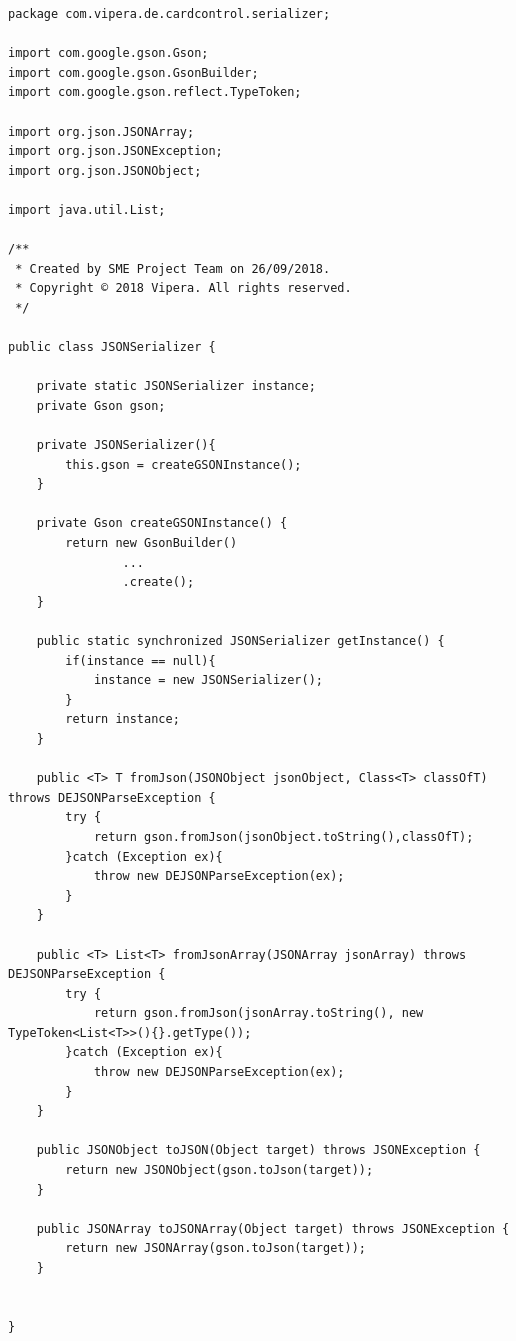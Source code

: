 \documentclass[a4paper, 12pt]{article}
\newenvironment{code}{\captionsetup{type=listing}}{}
\begin{document}
\begin{code}
\label{code:android-singleton}
\begin{verbatim}
package com.vipera.de.cardcontrol.serializer;

import com.google.gson.Gson;
import com.google.gson.GsonBuilder;
import com.google.gson.reflect.TypeToken;

import org.json.JSONArray;
import org.json.JSONException;
import org.json.JSONObject;

import java.util.List;

/**
 * Created by SME Project Team on 26/09/2018.
 * Copyright © 2018 Vipera. All rights reserved.
 */

public class JSONSerializer {

    private static JSONSerializer instance;
    private Gson gson;

    private JSONSerializer(){
        this.gson = createGSONInstance();
    }

    private Gson createGSONInstance() {
        return new GsonBuilder()
                ...
                .create();
    }

    public static synchronized JSONSerializer getInstance() {
        if(instance == null){
            instance = new JSONSerializer();
        }
        return instance;
    }

    public <T> T fromJson(JSONObject jsonObject, Class<T> classOfT) throws DEJSONParseException {
        try {
            return gson.fromJson(jsonObject.toString(),classOfT);
        }catch (Exception ex){
            throw new DEJSONParseException(ex);
        }
    }

    public <T> List<T> fromJsonArray(JSONArray jsonArray) throws DEJSONParseException {
        try {
            return gson.fromJson(jsonArray.toString(), new TypeToken<List<T>>(){}.getType());
        }catch (Exception ex){
            throw new DEJSONParseException(ex);
        }
    }

    public JSONObject toJSON(Object target) throws JSONException {
        return new JSONObject(gson.toJson(target));
    }

    public JSONArray toJSONArray(Object target) throws JSONException {
        return new JSONArray(gson.toJson(target));
    }


}

\end{verbatim}
\end{code}
\end{document}
